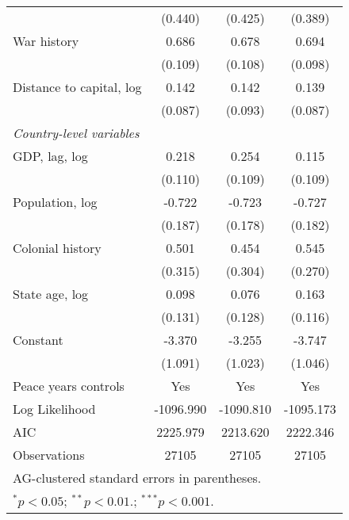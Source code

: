 \begin{table}[htbp]
\begin{tabular}{l*{3}{c}}
                    &     (0.440)         &     (0.425)         &     (0.389)         \\
War history         &       0.686\sym{***}&       0.678\sym{***}&       0.694\sym{***}\\
                    &     (0.109)         &     (0.108)         &     (0.098)         \\
Distance to capital, log&       0.142         &       0.142         &       0.139         \\
                    &     (0.087)         &     (0.093)         &     (0.087)         \\
\textit{Country-level variables}&                     &                     &                     \\
GDP, lag, log       &       0.218\sym{*}  &       0.254\sym{*}  &       0.115         \\
                    &     (0.110)         &     (0.109)         &     (0.109)         \\
Population, log     &      -0.722\sym{***}&      -0.723\sym{***}&      -0.727\sym{***}\\
                    &     (0.187)         &     (0.178)         &     (0.182)         \\
Colonial history    &       0.501         &       0.454         &       0.545\sym{*}  \\
                    &     (0.315)         &     (0.304)         &     (0.270)         \\
State age, log      &       0.098         &       0.076         &       0.163         \\
                    &     (0.131)         &     (0.128)         &     (0.116)         \\
Constant            &      -3.370\sym{**} &      -3.255\sym{**} &      -3.747\sym{***}\\
                    &     (1.091)         &     (1.023)         &     (1.046)         \\
\hline
Peace years controls&         Yes         &         Yes         &         Yes         \\
Log Likelihood      &   -1096.990         &   -1090.810         &   -1095.173         \\
AIC                 &    2225.979         &    2213.620         &    2222.346         \\
Observations        &       27105         &       27105         &       27105         \\
\hline\hline
\multicolumn{4}{l}{\footnotesize AG-clustered standard errors in parentheses.}\\
\multicolumn{4}{l}{\footnotesize $^{*}p<0.05$; $^{**}p<0.01.$; $^{***}p<0.001.$ }\\
\end{tabular}
\end{table}
